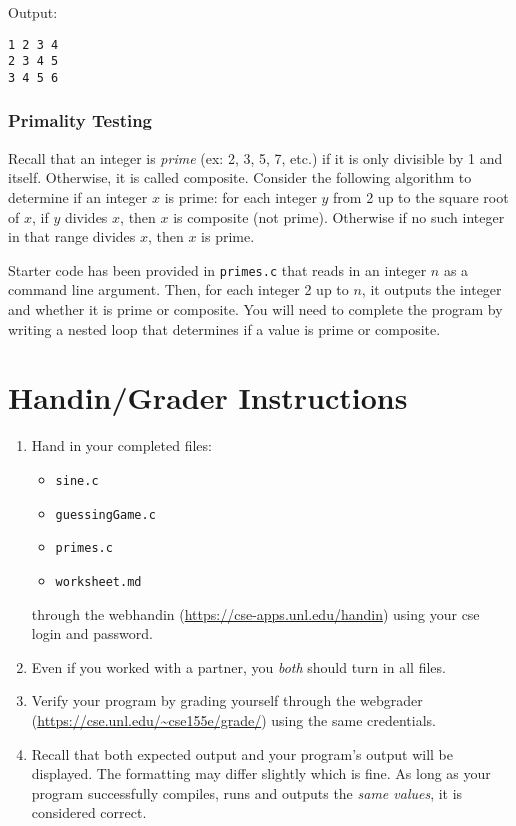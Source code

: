 \documentclass[12pt]{scrartcl}
\begin{document}
Output:

\begin{verbatim}
1 2 3 4
2 3 4 5
3 4 5 6
\end{verbatim}

\subsubsection*{Primality Testing}

Recall that an integer is \emph{prime} (ex: 2, 3, 5, 7, etc.) if it 
is only divisible by 1 and itself.  Otherwise, it is called composite.  
Consider the following algorithm to determine if an integer $x$ is 
prime: for each integer $y$ from 2 up to the square root of $x$, if $y$ 
divides $x$, then $x$ is composite (not prime).  Otherwise if no such 
integer in that range divides $x$, then $x$ is prime.  

Starter code has been provided in \texttt{primes.c}
that reads in an integer $n$ as a command line argument.  Then, for 
each integer 2 up to $n$, it outputs the integer 
and whether it is prime or composite.  You will need to complete
the program by writing a nested loop that determines if a value
is prime or composite.  

\section{Handin/Grader Instructions}

\begin{enumerate}
  \item Hand in your completed files:
  \begin{itemize}
    \item \texttt{sine.c}
    \item \texttt{guessingGame.c}
    \item \texttt{primes.c}
    \item \texttt{worksheet.md}
  \end{itemize}
  through the webhandin (\url{https://cse-apps.unl.edu/handin}) 
  using your cse login and password.  
  \item Even if you worked with a partner, you \emph{both} should
  turn in all files.
  \item Verify your program by grading yourself through the
  webgrader (\url{https://cse.unl.edu/~cse155e/grade/}) using the
  same credentials.
  \item Recall that both expected output and your program's output
  will be displayed.  The formatting may differ slightly which is fine.
  As long as your program successfully compiles, runs and outputs 
  the \emph{same values}, it is considered correct.
\end{enumerate}
\end{document}
